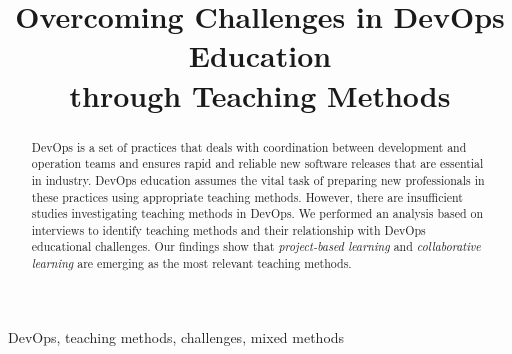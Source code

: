 \documentclass[10pt,conference]{IEEEtran}
\begin{document}
\title{Overcoming Challenges in DevOps Education\\ through Teaching Methods}




\author{
}


\maketitle

\begin{abstract}
DevOps is a set of practices that deals with coordination between development and operation teams and ensures rapid and reliable new software releases that are essential in industry. DevOps education assumes the vital task of preparing new professionals in these practices using appropriate teaching methods. However, there are insufficient studies investigating teaching methods in DevOps. We performed an analysis based on interviews to identify teaching methods and their relationship with DevOps educational challenges.  Our findings show that \textsl{project-based learning} and \textsl{collaborative learning} are emerging as the most relevant teaching methods.
\end{abstract}

\begin{IEEEkeywords}
DevOps, teaching methods, challenges, mixed methods\end{IEEEkeywords}
\end{document}
